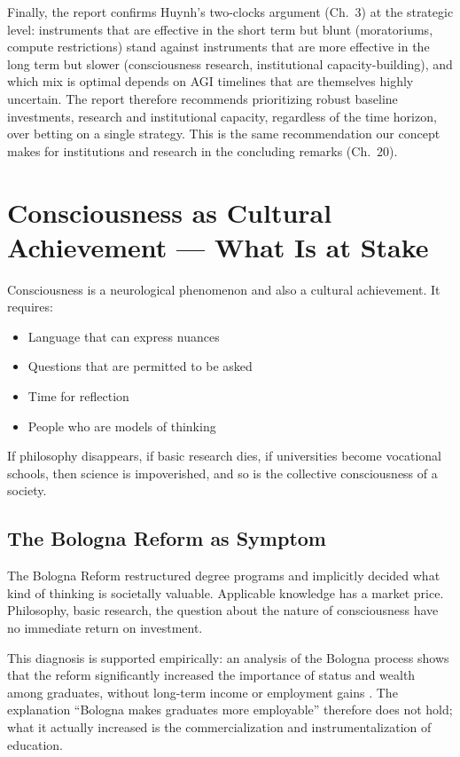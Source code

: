 \documentclass[acmlarge, nonacm]{acmart}
\begin{document}
Finally, the report confirms Huynh's two-clocks argument (Ch.~3) at the strategic level: instruments that are effective in the short term but blunt (moratoriums, compute restrictions) stand against instruments that are more effective in the long term but slower (consciousness research, institutional capacity-building), and which mix is optimal depends on AGI timelines that are themselves highly uncertain. The report therefore recommends prioritizing robust baseline investments, research and institutional capacity, regardless of the time horizon, over betting on a single strategy. This is the same recommendation our concept makes for institutions and research in the concluding remarks (Ch.~20).

\section{Consciousness as Cultural Achievement --- What Is at Stake}

Consciousness is a neurological phenomenon and also a cultural achievement. It requires:

\begin{itemize}
\item Language that can express nuances
\item Questions that are permitted to be asked
\item Time for reflection
\item People who are models of thinking
\end{itemize}

If philosophy disappears, if basic research dies, if universities become vocational schools, then science is impoverished, and so is the collective consciousness of a society.

\subsection{The Bologna Reform as Symptom}

The Bologna Reform restructured degree programs and implicitly decided what kind of thinking is societally valuable. Applicable knowledge has a market price. Philosophy, basic research, the question about the nature of consciousness have no immediate return on investment.

This diagnosis is supported empirically: an analysis of the Bologna process shows that the reform significantly increased the importance of status and wealth among graduates, without long-term income or employment gains \cite{giani2025}. The explanation ``Bologna makes graduates more employable'' therefore does not hold; what it actually increased is the commercialization and instrumentalization of education.
\end{document}
